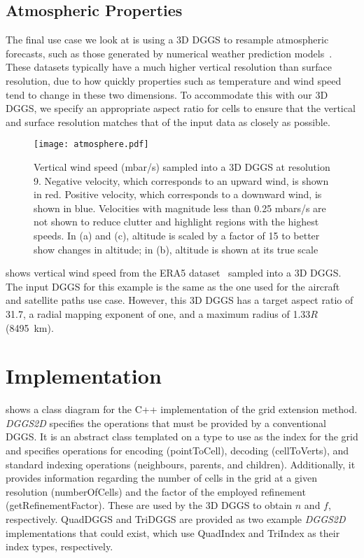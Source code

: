 \subsection{Atmospheric Properties}
The final use case we look at is using a 3D DGGS to resample atmospheric forecasts, such as those generated by numerical weather prediction models~\cite{ncepncar, era5}.
These datasets typically have a much higher vertical resolution than surface resolution, due to how quickly properties such as temperature and wind speed tend to change in these two dimensions.
To accommodate this with our 3D DGGS, we specify an appropriate aspect ratio for cells to ensure that the vertical and surface resolution matches that of the input data as closely as possible.


\begin{figure}[ht!]
	\centering
	\texttt{[image: atmosphere.pdf]}
	\caption[Atmospheric properties resampling use case showing vertical wind speed]{
		Vertical wind speed (mbar/s) sampled into a 3D DGGS at resolution 9.
		Negative velocity, which corresponds to an upward wind, is shown in red.
		Positive velocity, which corresponds to a downward wind, is shown in blue.
		Velocities with magnitude less than 0.25 mbars/s are not shown to reduce clutter and highlight regions with the highest speeds.
		In (a) and (c), altitude is scaled by a factor of 15 to better show changes in altitude; in (b), altitude is shown at its true scale
	}
	\label{fig:atmosphere}
\end{figure}


 shows vertical wind speed from the ERA5 dataset~\cite{era5} sampled into a 3D DGGS.
The input DGGS for this example is the same as the one used for the aircraft and satellite paths use case.
However, this 3D DGGS has a target aspect ratio of 31.7, a radial mapping exponent of one, and a maximum radius of 1.33$R$ (8495~km).


\section{Implementation} \label{chap:8:impl}
 shows a class diagram for the C++ implementation of the grid extension method. \textit{DGGS2D} specifies the operations that must be provided by a conventional DGGS.
It is an abstract class templated on a type to use as the index for the grid and specifies operations for encoding (pointToCell), decoding (cellToVerts), and standard indexing operations (neighbours, parents, and children).
Additionally, it provides information regarding the number of cells in the grid at a given resolution (numberOfCells) and the factor of the employed refinement (getRefinementFactor).
These are used by the 3D DGGS to obtain $n$ and $f$, respectively. QuadDGGS and TriDGGS are provided as two example \textit{DGGS2D} implementations that could exist, which use QuadIndex and TriIndex as their index types, respectively.


